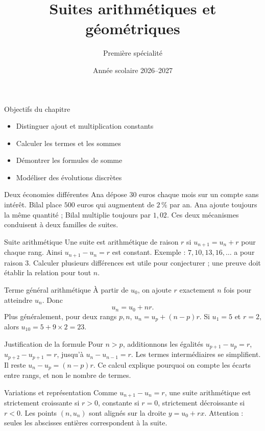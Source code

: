 \documentclass[aspectratio=169,12pt]{beamer}
\title{Suites arithmétiques et géométriques}
\subtitle{Première spécialité}
\date{Année scolaire 2026--2027}
\begin{document}
\begin{frame}\titlepage\end{frame}
\begin{frame}{Objectifs du chapitre}\begin{itemize}
\item Distinguer ajout et multiplication constants
\item Calculer les termes et les sommes
\item Démontrer les formules de somme
\item Modéliser des évolutions discrètes
\end{itemize}\end{frame}
\renewcommand{\slidekind}{COMPRENDRE}
\begin{frame}[t,fragile]{Deux économies différentes}
Ana dépose $30$ euros chaque mois sur un compte sans intérêt. Bilal place $500$ euros qui augmentent de $2\,\%$ par an. Ana ajoute toujours la même quantité ; Bilal multiplie toujours par $1,02$. Ces deux mécanismes conduisent à deux familles de suites.
\end{frame}
\renewcommand{\slidekind}{COMPRENDRE}
\begin{frame}[t,fragile]{Suite arithmétique}
Une suite est arithmétique de raison $r$ si $u_{n+1}=u_n+r$ pour chaque rang. Ainsi $u_{n+1}-u_n=r$ est constant. Exemple : $7,10,13,16,\ldots$ a pour raison $3$. Calculer plusieurs différences est utile pour conjecturer ; une preuve doit établir la relation pour tout $n$.
\end{frame}
\renewcommand{\slidekind}{COMPRENDRE}
\begin{frame}[t,fragile]{Terme général arithmétique}
À partir de $u_0$, on ajoute $r$ exactement $n$ fois pour atteindre $u_n$. Donc \[u_n=u_0+nr.\] Plus généralement, pour deux rangs $p,n$, $u_n=u_p+(n-p)r$. Si $u_1=5$ et $r=2$, alors $u_{10}=5+9\times2=23$.
\end{frame}
\renewcommand{\slidekind}{JUSTIFIER}
\begin{frame}[t,fragile]{Justification de la formule}
Pour $n>p$, additionnons les égalités $u_{p+1}-u_p=r$, $u_{p+2}-u_{p+1}=r$, jusqu’à $u_n-u_{n-1}=r$. Les termes intermédiaires se simplifient. Il reste $u_n-u_p=(n-p)r$. Ce calcul explique pourquoi on compte les écarts entre rangs, et non le nombre de termes.
\end{frame}
\renewcommand{\slidekind}{COMPRENDRE}
\begin{frame}[t,fragile]{Variations et représentation}
Comme $u_{n+1}-u_n=r$, une suite arithmétique est strictement croissante si $r>0$, constante si $r=0$, strictement décroissante si $r<0$. Les points $(n,u_n)$ sont alignés sur la droite $y=u_0+rx$. Attention : seules les abscisses entières correspondent à la suite.
\end{frame}
\end{document}
